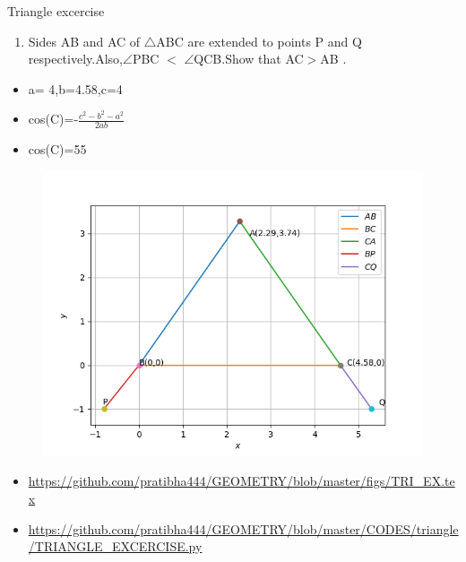 \begin{frame}{Triangle excercise}
\begin{enumerate}
\item Sides AB and AC of $\triangle$ABC are extended to points P and Q respectively.Also,$\angle$PBC $<$ $\angle$QCB.Show that AC$>$AB .
\begin{center}

\end{center}
\end{enumerate}
\begin{itemize}
\item a= 4,b=4.58,c=4
\item cos(C)=-$\frac{c^2 - b^2 -a^2}{2ab}$
\item cos(C)=55

\seti
\end{itemize}
\end{frame}
\begin{frame}
\begin{center}
\begin{figure}
\includegraphics[scale=.4]{./CODES/triangle/tri_ex.png}
\end{figure}
\end{center}
\begin{itemize}
\item \url{https://github.com/pratibha444/GEOMETRY/blob/master/figs/TRI_EX.tex}
\item \url{https://github.com/pratibha444/GEOMETRY/blob/master/CODES/triangle/TRIANGLE_EXCERCISE.py}
\end{itemize}
\end{frame}



